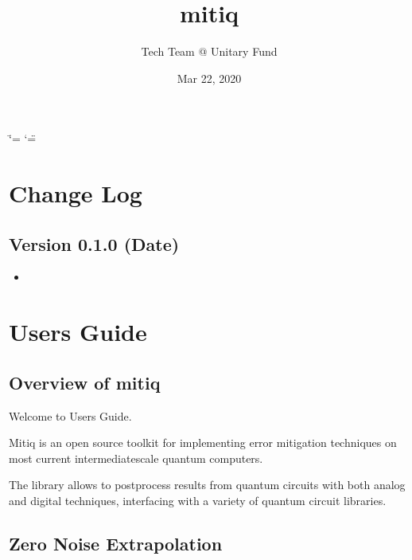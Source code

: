 \documentclass[letterpaper,10pt,english]{sphinxmanual}
\title{mitiq}
\date{Mar 22, 2020}
\author{Tech Team @ Unitary Fund}
\begin{document}
\ifdefined\shorthandoff
  \ifnum\catcode`\=\string=\active\shorthandoff{=}\fi
  \ifnum\catcode`\"=\active{}\fi
\fi

\pagestyle{empty}
\sphinxmaketitle
\pagestyle{plain}
\sphinxtableofcontents
\pagestyle{normal}
\label{\detokenize{index::doc}}



\chapter{Change Log}
\label{\detokenize{changelog:change-log}}\label{\detokenize{changelog:changelog}}\label{\detokenize{changelog::doc}}

\section{Version 0.1.0 (Date)}
\label{\detokenize{changelog:version-0-1-0-date}}\begin{itemize}
\item {} 

\end{itemize}


\chapter{Users Guide}
\label{\detokenize{guide/guide:users-guide}}\label{\detokenize{guide/guide:guide}}\label{\detokenize{guide/guide::doc}}

\section{Overview of mitiq}
\label{\detokenize{guide/guide-overview:overview-of-mitiq}}\label{\detokenize{guide/guide-overview::doc}}
Welcome to  Users Guide.

Mitiq is an open source toolkit for implementing error mitigation techniques on most current intermediate\sphinxhyphen{}scale quantum computers.

The library allows to postprocess results from quantum circuits with both analog and digital techniques, interfacing with a variety of quantum circuit libraries.


\section{Zero Noise Extrapolation}
\label{\detokenize{guide/guide-zne:zero-noise-extrapolation}}\label{\detokenize{guide/guide-zne::doc}}
\end{document}
